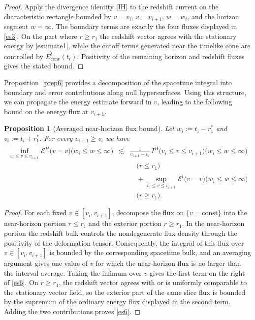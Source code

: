 \documentclass[11pt]{article}
\numberwithin{equation}{section}
\theoremstyle{plain}
\newtheorem{proposition}[theorem]{Proposition}
\theoremstyle{definition}
\theoremstyle{remark}
\begin{document}
\begin{proof}
Apply the divergence identity \eqref{IH} to the redshift current on the characteristic rectangle bounded by \(v=v_i\), \(v=v_{i+1}\), \(w=w_i\), and the horizon segment \(w=\infty\).  The boundary terms are exactly the four fluxes displayed in \eqref{es3}.  On the part where \(r\ge r_1\) the redshift vector agrees with the stationary energy by \eqref{estimate1}, while the cutoff terms generated near the timelike cone are controlled by \(E^{\hat t}_{\mathrm{cone}}(t_i)\).  Positivity of the remaining horizon and redshift fluxes gives the stated bound.
\end{proof}
Proposition~\ref{prep6} provides a decomposition of the spacetime integral into boundary and error contributions along null hypersurfaces. Using this structure, we can propagate the energy estimate forward in $v$, leading to the following bound on the energy flux at $v_{i+1}$.
\begin{proposition}[Averaged near-horizon flux bound]\label{prep7}
Let $w_i:=t_i-r_1^{\ast}$ and $v_i:=t_i+r_1^{\ast}$. For every $v_{i+1}\ge v_i$ we have
\begin{eqnarray}\label{es6}
\inf_{v_i\le v\le v_{i+1}}
\mathcal E^{\hat H}\bigl(v=v\bigr)\bigl(w_i\le w\le \infty\bigr)
&\lesssim&
\frac{1}{v_{i+1}-v_i}\,
I^{\hat H}\bigl(v_i\le v\le v_{i+1}\bigr)\bigl(w_i\le w\le \infty\bigr)\nonumber\\
&&\quad\bigl(r\le r_1\bigr)\nonumber\\
&&\quad+\sup_{v_i\le v\le v_{i+1}}
\mathcal E^{\hat t}\bigl(v=v\bigr)\bigl(w_i\le w\le \infty\bigr)\nonumber\\
&&\quad\bigl(r\ge r_1\bigr).
\end{eqnarray}
\end{proposition}
\begin{proof}
For each fixed $v\in[v_i,v_{i+1}]$, decompose the flux on $\{v=\mathrm{const}\}$ into the near-horizon portion $r\le r_1$ and the exterior portion $r\ge r_1$.  In the near-horizon portion the redshift bulk controls the nondegenerate flux density through the positivity of the deformation tensor.  Consequently, the integral of this flux over $v\in[v_i,v_{i+1}]$ is bounded by the corresponding spacetime bulk, and an averaging argument gives one value of $v$ for which the near-horizon flux is no larger than the interval average.  Taking the infimum over $v$ gives the first term on the right of \eqref{es6}.  On $r\ge r_1$, the redshift vector agrees with or is uniformly comparable to the stationary vector field, so the exterior part of the same slice flux is bounded by the supremum of the ordinary energy flux displayed in the second term.  Adding the two contributions proves \eqref{es6}.
\end{proof}
\end{document}
